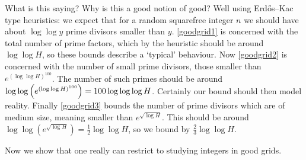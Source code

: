 \documentclass{lecturenotes}
\numberwithin{equation}{section}
\begin{document}
What is this saying?  Why is this a good notion of good?  Well using Erd\H{o}s--Kac type heuristics: we expect that for a random squarefree integer $n$ we should have about $\log \log y$ prime divisors smaller than $y$.  \eqref{goodgrid1} is concerned with the total number of prime factors, which by the heuristic should be around $\log\log H$, so these bounds describe a `typical' behaviour.  Now \eqref{goodgrid2} is concerned with the number of small prime divisors, those smaller than $e^{(\log\log H)^{100}}$.  The number of such primes should be around $\log\log\left({e^{(\log\log H)^{100}}}\right)=100\log\log\log H$.  Certainly our bound should then model reality.  Finally \eqref{goodgrid3} bounds the number of prime divisors which are of medium size, meaning smaller than $e^{\sqrt{\log H}}$.  This should be around $\log\log(e^{\sqrt{\log H}})=\frac{1}{2}\log\log H$, so we bound by $\frac{2}{3}\log\log H$.

Now we show that one really can restrict to studying integers in good grids.
\end{document}
